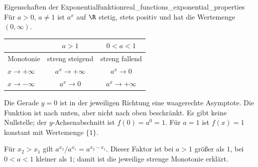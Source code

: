 \begin{TheoremBox}{Eigenschaften der Exponentialfunktion}{real_functions_exponential_properties}
  Für $a>0$, $a\ne1$ ist $a^x$ auf $\R$ stetig, stets positiv und
  hat die \textcolor{green!55!black}{Wertemenge} $(0,\infty)$.
  \begin{center}
    \renewcommand{\arraystretch}{1.4}
    \begin{tabular}{@{}lcc@{}}
      \toprule
       & $a>1$ & $0<a<1$\\ \midrule
      Monotonie & streng steigend & streng fallend\\
      $x\to+\infty$ & $a^x\to+\infty$ & $a^x\to0$\\
      $x\to-\infty$ & $a^x\to0$ & $a^x\to+\infty$\\
      \bottomrule
    \end{tabular}
  \end{center}
  Die Gerade $y=0$ ist in der jeweiligen Richtung eine waagerechte
  Asymptote. Die Funktion ist nach unten, aber nicht nach oben beschränkt.
  Es gibt keine Nullstelle; der $y$-Achsenabschnitt ist $f(0)=a^0=1$.
  Für $a=1$ ist $f(x)=1$ konstant mit \textcolor{green!55!black}{Wertemenge} $\{1\}$.
\end{TheoremBox}
Für $x_2>x_1$ gilt $a^{x_2}/a^{x_1}=a^{x_2-x_1}$.
Dieser Faktor ist bei $a>1$ größer als $1$, bei $0<a<1$ kleiner als $1$;
damit ist die jeweilige strenge Monotonie erklärt.
